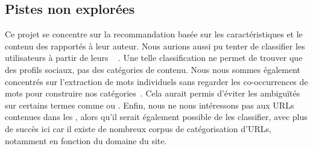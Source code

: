 \subsection{Pistes non explorées} \label{sec:pistes}

Ce projet se concentre sur la recommandation basée sur les caractéristiques et
le contenu des \tweets{} rapportés à leur auteur. Nous aurions aussi pu tenter
de classifier les utilisateurs à partir de leurs \tweets~
\citep{Pennacchiotti11}. Une telle classification ne permet de trouver que des
profils sociaux, pas des catégories de contenu. Nous nous sommes également
concentrés sur l’extraction de mots individuels sans regarder les
co-occurrences de mots pour construire nos
catégories~\citep{Ramage2010,Rigouste06}. Cela aurait permis d’éviter les
ambiguïtés sur certains termes comme  ou . Enfin, nous ne
nous intéressons pas aux URLs contenues dans les \tweets{}, alors qu’il serait
également possible de les classifier, avec plus de succès ici car il existe de
nombreux corpus de catégorisation d’URLs, notamment en fonction du domaine du
site.
